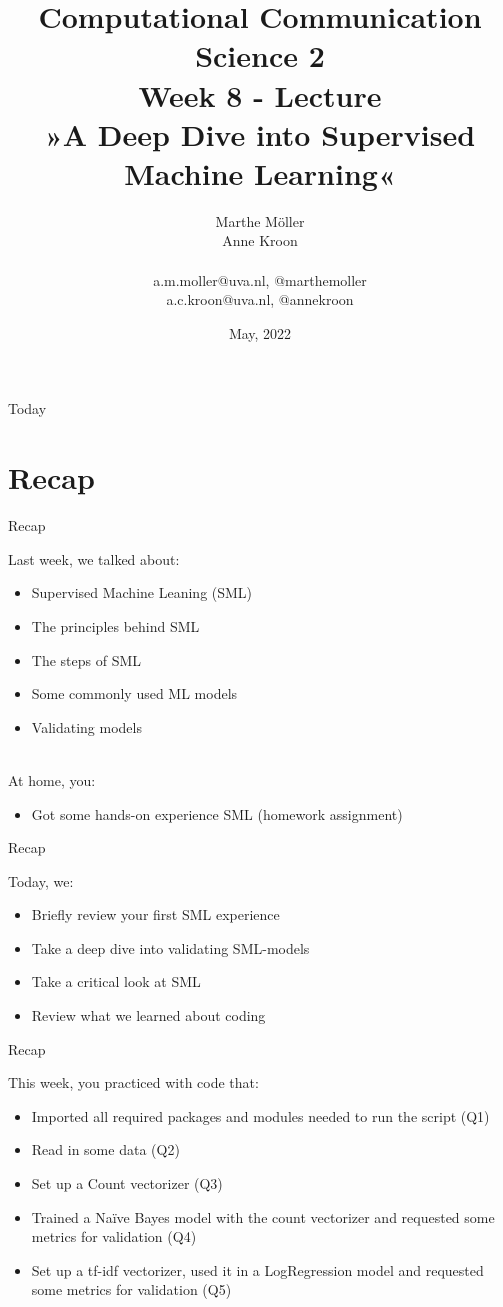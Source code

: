 \documentclass[handout]{beamer}
\title[Computational Communication Science 2]{\textbf{Computational Communication Science 2} \\Week 8 - Lecture\\ »A Deep Dive into Supervised Machine Learning«}
\author[Marthe Möller, Anne Kroon]{Marthe Möller \\ Anne Kroon \\ ~ \\ \footnotesize{a.m.moller@uva.nl, @marthemoller \\a.c.kroon@uva.nl, @annekroon} \\}
\date{May, 2022}
\institute[Digital Society Minor, University of Amsterdam]{Digital Society Minor, University of Amsterdam}
\begin{document}
	
	\begin{frame}{}
		\titlepage
\end{frame}
	
\begin{frame}{Today}
		\tableofcontents
\end{frame}


\section{Recap}

\begin{frame}{Recap}
	
Last week, we talked about:
	\begin{itemize}
		\item Supervised Machine Leaning (SML)
		\item The principles behind SML
		\item The steps of SML
		\item Some commonly used ML models
		\item Validating models \\\
	\end{itemize}
	
At home, you:
	\begin{itemize}
		\item Got some hands-on experience SML (homework assignment)
	\end{itemize}
	
\end{frame}


\begin{frame}{Recap}
	
Today, we:
	\begin{itemize}
		\item Briefly review your first SML experience
		\item Take a deep dive into validating SML-models
		\item Take a critical look at SML 
		\item Review what we learned about coding
	\end{itemize}
	
\end{frame}


\begin{frame}{Recap}
	
This week, you practiced with code that:
\begin{itemize}
	\item Imported all required packages and modules needed to run the script (Q1)
	\item Read in some data (Q2)
	\item Set up a Count vectorizer (Q3)
	\item Trained a Naïve Bayes model with the count vectorizer and requested some metrics for validation (Q4)
	\item Set up a tf-idf vectorizer, used it in a LogRegression model and requested some metrics for validation (Q5)
\end{itemize}
	
\end{frame}
\end{document}
